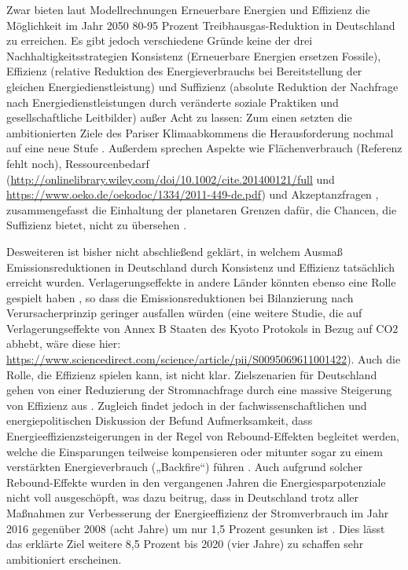 \documentclass[a4paper,11pt,twoside]{scrartcl}
\begin{document}
Zwar bieten laut Modellrechnungen Erneuerbare Energien und Effizienz die Möglichkeit im Jahr 2050 80-95 Prozent Treibhausgas-Reduktion in Deutschland \cite{BMWi2017} zu erreichen. Es gibt jedoch verschiedene Gründe keine der drei Nachhaltigkeitsstrategien Konsistenz (Erneuerbare Energien ersetzen Fossile), Effizienz (relative Reduktion des Energieverbrauchs bei Bereitstellung der gleichen Energiedienstleistung) und Suffizienz (absolute Reduktion der Nachfrage nach Energiedienstleistungen durch veränderte soziale Praktiken und gesellschaftliche Leitbilder) außer Acht zu lassen: Zum einen setzten die ambitionierten Ziele des Pariser Klimaabkommens die Herausforderung nochmal auf eine neue Stufe \cite{Rogelj2018}. Außerdem sprechen Aspekte wie Flächenverbrauch (Referenz fehlt noch), Ressourcenbedarf (\url{http://onlinelibrary.wiley.com/doi/10.1002/cite.201400121/full} und \url{https://www.oeko.de/oekodoc/1334/2011-449-de.pdf}) und Akzeptanzfragen \cite{Fuchs2016}, zusammengefasst die Einhaltung der planetaren Grenzen \cite{Rockstroem2009} dafür, die Chancen, die Suffizienz bietet, nicht zu übersehen \cite{SAMADI2017}.

Desweiteren ist bisher nicht abschließend geklärt, in welchem Ausmaß Emissionsreduktionen in Deutschland durch Konsistenz und Effizienz tatsächlich erreicht wurden. Verlagerungseffekte in andere Länder könnten ebenso eine Rolle gespielt haben \cite{Wiedmann2015}, so dass die Emissionsreduktionen bei Bilanzierung nach Verursacherprinzip geringer ausfallen würden (eine weitere Studie, die auf Verlagerungseffekte von Annex B Staaten des Kyoto Protokols in Bezug auf CO2 abhebt, wäre diese hier: \url{https://www.sciencedirect.com/science/article/pii/S0095069611001422}). Auch die Rolle, die Effizienz spielen kann, ist nicht klar. Zielszenarien für Deutschland gehen von einer Reduzierung der Stromnachfrage durch eine massive Steigerung von Effizienz aus \cite{BMWi2017}. Zugleich findet jedoch in der fachwissenschaftlichen und energiepolitischen Diskussion der Befund Aufmerksamkeit, dass Energieeffizienzsteigerungen in der Regel von Rebound-Effekten begleitet werden, welche die Einsparungen teilweise kompensieren oder mitunter sogar zu einem verstärkten Energieverbrauch („Backfire“) führen \cite{DeutscherBundestag2013,Santarius2012}. Auch aufgrund solcher Rebound-Effekte wurden in den vergangenen Jahren die Energiesparpotenziale nicht voll ausgeschöpft, was dazu beitrug, dass in Deutschland trotz aller Maßnahmen zur Verbesserung der Energieeffizienz der Stromverbrauch im Jahr 2016 gegenüber 2008 (acht Jahre) um nur 1,5 Prozent gesunken ist \cite{UBA2017}. Dies lässt das erklärte Ziel weitere 8,5 Prozent bis 2020 (vier Jahre) zu schaffen sehr ambitioniert erscheinen.
\end{document}
